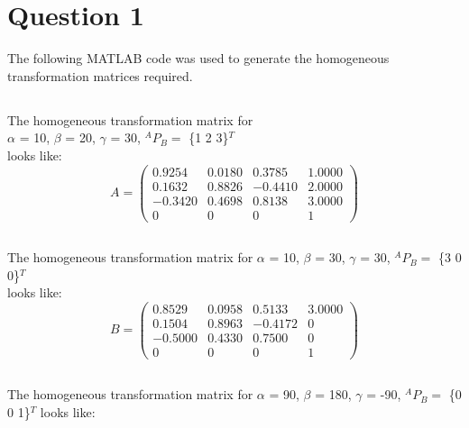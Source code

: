 \newpage
\section{Question 1}
	The following MATLAB code was used to generate the homogeneous transformation matrices required.

	
	
	\subsection{}	%
		The homogeneous transformation matrix for\\
		$\alpha$ = 10\degree, 
		$\beta$ = 20\degree, 
		$\gamma$ = 30\degree, $^{A}P_{B} =$ \{1 2 3\}$^{T}$\\
		looks like:\\
	
		$$
		A =
		\begin{pmatrix}
			0.9254 & 0.0180 & 0.3785 & 1.0000\\
			0.1632 & 0.8826 & -0.4410 & 2.0000\\
			-0.3420  & 0.4698  & 0.8138 & 3.0000\\
			0 & 0 & 0 & 1
		\end{pmatrix}
		$$
		
	\subsection{}	%
		The homogeneous transformation matrix for\newline
		$\alpha$ = 10\degree, 
		$\beta$ = 30\degree, 
		$\gamma$ = 30\degree, $^{A}P_{B} =$ \{3 0 0\}$^{T}$\\
		looks like:\\
		
		$$
		B =
		\begin{pmatrix}
			0.8529 & 0.0958 & 0.5133 & 3.0000\\
			0.1504 & 0.8963 & -0.4172 & 0\\
			-0.5000  & 0.4330  & 0.7500 & 0\\
			0 & 0 & 0 & 1
		\end{pmatrix}
		$$		
	\subsection{}	%
		The homogeneous transformation matrix for\newline
		$\alpha$ = 90\degree, 
		$\beta$ = 180\degree, 
		$\gamma$ = -90\degree, $^{A}P_{B} =$ \{0 0 1\}$^{T}$\newline
		looks like:\\
		
